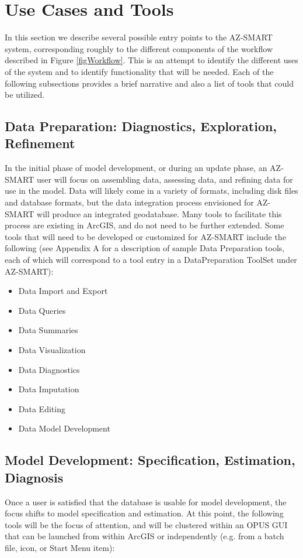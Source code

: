 \section{Use Cases and Tools}

In this section we describe several possible entry points to the AZ-SMART system, corresponding roughly to the different components of the workflow described in Figure \ref{figWorkflow}.
This is an attempt to identify the different uses of the system and to identify
functionality that will be needed.  Each of the following subsections
provides a brief narrative and also a list of tools that could be utilized.

\subsection{Data Preparation: Diagnostics, Exploration, Refinement}

In the initial phase of model development, or during an update phase, an AZ-SMART user will 
focus on assembling data, assessing data, and refining data for use in the model.  Data will
likely come in a variety of formats, including disk files and database formats,
but the data integration process envisioned for AZ-SMART will produce an integrated geodatabase.
Many tools to facilitate this process are existing in ArcGIS, and do not need to be further extended.  Some tools that will need to be developed or customized for AZ-SMART include the following 
(see Appendix A for a description of sample Data Preparation tools, each of which will correspond to a tool entry in a DataPreparation ToolSet under AZ-SMART):

\begin{itemize}
    \item Data Import and Export
    \item Data Queries
    \item Data Summaries
    \item Data Visualization
    \item Data Diagnostics
    \item Data Imputation
    \item Data Editing
    \item Data Model Development
\end{itemize}

\subsection{Model Development: Specification, Estimation, Diagnosis}
Once a user is satisfied that the database is usable for model development, the focus shifts to model specification and estimation.  At this point, the following tools will be the focus of attention, and will be clustered within an OPUS GUI that can be launched from within ArcGIS or independently (e.g. from a batch file, icon, or Start Menu item):

